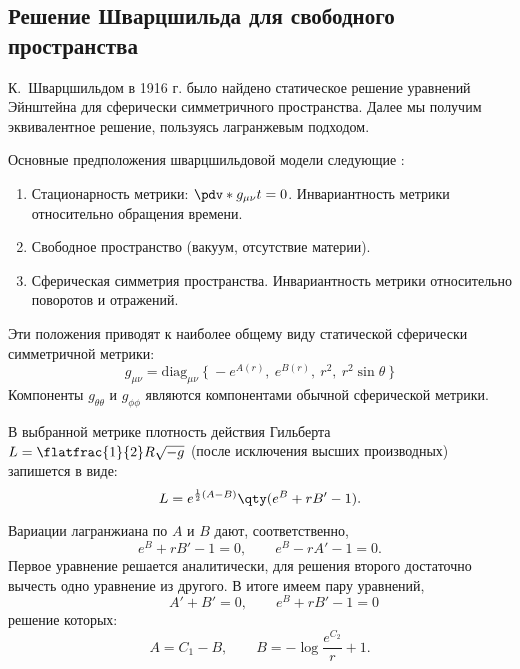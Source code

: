 \documentclass[\docroot/reports/draft/report.tex]{subfiles}
\begin{document}
\onlyinsubfile{\tableofcontents}

\subsection{Решение Шварцшильда для свободного пространства}

    К.~Шварцшильдом в 1916 г. \cite{schwarzschild_free_space_rus}\footnotemark{} было найдено статическое решение уравнений Эйнштейна для сферически симметричного пространства. Далее мы получим эквивалентное решение, пользуясь лагранжевым подходом.


    Основные предположения шварцшильдовой модели следующие \cite{schwarzschild_free_space_rus}:
    \begin{enumerate}
        \item Стационарность метрики: $\pdv*{g_{\mu\nu}}{t} = 0$. Инвариантность метрики относительно обращения времени.
        \item Свободное пространство (вакуум, отсутствие материи).
        \item Сферическая симметрия пространства. Инвариантность метрики относительно поворотов и отражений.
    \end{enumerate}
    Эти положения приводят к наиболее общему виду статической сферически симметричной метрики:
    \begin{equation*}
        g_{\mu\nu} = \text{diag}_{\mu\nu}\ \{\ -e^{A(r)},\ e^{B(r)},\ r^2,\ r^2 \sin\theta \ \}
    \end{equation*}
    Компоненты $g_{\theta\theta}$ и $g_{\phi\phi}$ являются компонентами обычной сферической метрики.

    В выбранной метрике плотность действия Гильберта $L = \flatfrac{1}{2} R \sqrt{-g}$ (после исключения высших производных) запишется в виде:
    \begin{equation*}
        L = e^{\frac{1}{2} (A - B)} \qty(e^B + r B' - 1) .
    \end{equation*}

    Вариации лагранжиана по $A$ и $B$ дают, соответственно,
    \begin{equation*}
        e^B + r B' - 1 = 0 , \qquad e^B - r A' - 1 = 0 .
    \end{equation*}
    Первое уравнение решается аналитически, для решения второго достаточно вычесть одно уравнение из другого. В итоге имеем пару уравнений,
    \begin{equation*}
        \qquad A' + B' = 0 , \qquad e^B + r B' - 1 = 0
    \end{equation*}
    решение которых:
    \begin{equation*}
        A = C_1 - B , \qquad B = - \log{\frac{e^{C_2}}{r} + 1} .
    \end{equation*}
\end{document}
